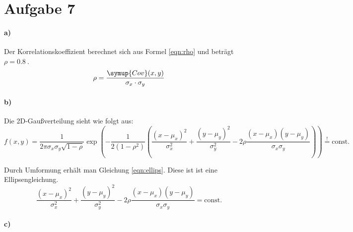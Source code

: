 \section{Aufgabe 7}

\paragraph{a)} %

Der Korrelationskoeffizient berechnet sich aus Formel \eqref{eqn:rho} und beträgt $\rho = \SI{0,8}{}$.
\begin{equation}
  \rho = \frac{\symup{Cov} (x, y)}{\sigma_x \cdot \sigma_y}
  \label{eqn:rho}
\end{equation}

\paragraph{b)} %

Die 2D-Gaußverteilung sieht wie folgt aus:
\begin{equation*}
  f(x, y) = \frac{1}{2 \pi \sigma_x \sigma_y \sqrt{1-\rho}} \exp{\left(-\frac{1}{2(1-\rho^2)}\left(\frac{(x-\mu_x)^2}{\sigma^2_x} + \frac{(y-\mu_y)^2}{\sigma^2_y} - 2 \rho \frac{(x-\mu_x) (y-\mu_y)}{\sigma_x \sigma_y} \right)\right)} \overset{!}{=} \mathrm{const.}
\end{equation*}

Durch Umformung erhält man Gleichung \ref{eqn:ellips}. Diese ist ist eine Ellipsengleichung.
\begin{equation}
  \frac{(x-\mu_x)^2}{\sigma^2_x}+ \frac{(y-\mu_y)^2}{\sigma^2_y} - 2 \rho \frac{(x-\mu_x) (y-\mu_y)}{\sigma_x \sigma_y} = \mathrm{const.}
  \label{eqn:ellips}
\end{equation}

\paragraph{c)}


